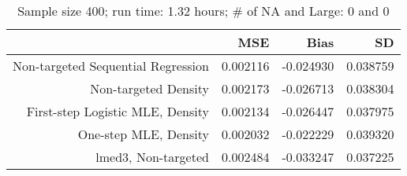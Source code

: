 \begin{table}[ht]
\centering
\caption{Sample size 400; run time: 1.32 hours; # of NA and Large:  0 and 0} 
\begin{tabular}{rrrr}
  \hline
 & MSE & Bias & SD \\ 
  \hline
Non-targeted Sequential Regression & 0.002116 & -0.024930 & 0.038759 \\ 
  Non-targeted Density & 0.002173 & -0.026713 & 0.038304 \\ 
  First-step Logistic MLE, Density & 0.002134 & -0.026447 & 0.037975 \\ 
  One-step MLE, Density & 0.002032 & -0.022229 & 0.039320 \\ 
  lmed3, Non-targeted & 0.002484 & -0.033247 & 0.037225 \\ 
   \hline
\end{tabular}
\end{table}
